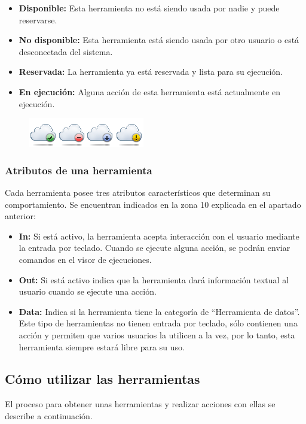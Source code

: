 \begin{itemize}
\item \textbf{Disponible:} Esta herramienta no está siendo usada por nadie y 
puede reservarse. 
\item \textbf{No disponible:} Esta herramienta está siendo usada por otro 
usuario o está desconectada del sistema.
\item \textbf{Reservada:} La herramienta ya está reservada y lista para su 
ejecución.
\item \textbf{En ejecución:} Alguna acción de esta herramienta está 
actualmente en ejecución.
\end{itemize}

\begin{figure}[h]
	\centering
	\includegraphics[scale=1]{images/user/statustools.png}
\end{figure}

\subsubsection*{Atributos de una herramienta}
Cada herramienta posee tres atributos característicos que determinan 
su comportamiento. Se encuentran indicados en la zona 10 explicada en 
el apartado anterior:

\begin{itemize}
\item \textbf{In:} Si está activo, la herramienta acepta interacción con el 
usuario mediante la entrada por teclado. Cuando se ejecute alguna 
acción, se podrán enviar comandos en el visor de ejecuciones.
\item \textbf{Out:} Si está activo indica que la herramienta dará información 
textual al usuario cuando se ejecute una acción.
\item \textbf{Data:} Indica si la herramienta tiene la categoría de 
``Herramienta de datos''. Este tipo de herramientas no tienen entrada 
por teclado, sólo contienen una acción y permiten que varios usuarios 
la utilicen a la vez, por lo tanto, esta herramienta siempre estará 
libre para su uso.
\end{itemize}

\subsection*{Cómo utilizar las herramientas}
El proceso para obtener unas herramientas y realizar acciones con 
ellas se describe a continuación.

